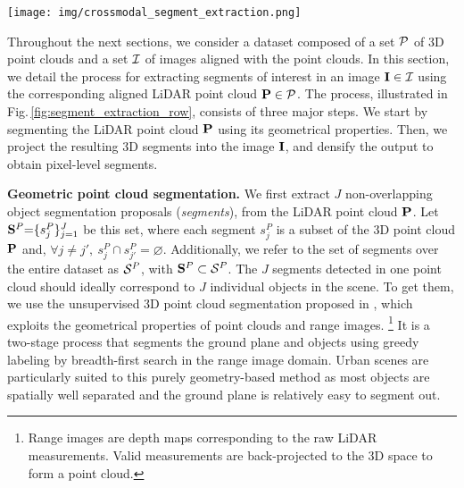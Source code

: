 \documentclass[runningheads]{llncs}
\newcommand{\paragraphcustom}[1]{\smallskip\noindent\textbf{#1}}
\begin{document}
\begin{figure*}[t]
    \centering
    \vspace{-5pt}
    \texttt{[image: img/crossmodal\_segment\_extraction.png]}
    \vspace{-22pt}
    \caption{\textbf{Cross-modal segment extraction}. Input raw point cloud (a) is first segmented with~\cite{bogoslavskyi17pfg}
    into object segment candidates (b), which are then projected into the image (c); Projected segments are densified to get pixel-level pseudo-labels, with missed pixels being labeled as ``ignore'', as shown in black (d).
    }
    \label{fig:segment_extraction_row}
    \vspace*{-6mm}
\end{figure*}

Throughout the next sections, we consider a dataset composed of a set $\mathcal{P}$ of 3D point clouds and a set $\mathcal{I}$ of images aligned with the point clouds. In this section, we detail the process for extracting segments of interest in an image $\mathbf{I} \in \mathcal{I}$ using the corresponding aligned LiDAR point cloud $\mathbf{P} \in \mathcal{P}$. The process, illustrated in Fig.\,\ref{fig:segment_extraction_row}, consists of three major steps. We start by segmenting the LiDAR point cloud 
$\mathbf{P}$ using its geometrical properties. Then, we project the resulting 3D segments into the image
$\mathbf{I}$, and densify the output to obtain pixel-level segments. 

\paragraphcustom{Geometric point cloud segmentation.} 
We first extract $J$ non-overlapping object segmentation proposals (\emph{segments}), from the LiDAR point cloud
$\mathbf{P}$. Let $\mathbf{S}^P{=}\{s^P_{j}\}_{j=1}^{J}$ be this set, where each segment $s^P_{j}$ is a subset of the 3D point cloud $\mathbf{P}$ and, ${\forall j \neq j',\ s^P_{j} \cap s^P_{j'} = \varnothing}$. Additionally, we refer to the set of segments over the entire dataset as $\mathcal{S}^P$, with $\mathbf{S}^P \subset \mathcal{S}^P$. The $J$ segments detected in one point cloud should ideally correspond to $J$ individual objects in the scene. To get them, we use the unsupervised 3D point cloud segmentation proposed in \cite{bogoslavskyi17pfg}, which exploits the geometrical properties of point clouds and range images.
\footnote{
Range images are depth maps corresponding to the raw LiDAR measurements. Valid measurements are back-projected to the 3D space to form a point cloud.
} 
It is a two-stage process that segments the ground plane and objects using greedy labeling by breadth-first search in the range image domain. Urban scenes are particularly suited to this purely geometry-based method as most objects are spatially well separated and the ground plane is relatively easy to segment out.
\end{document}
